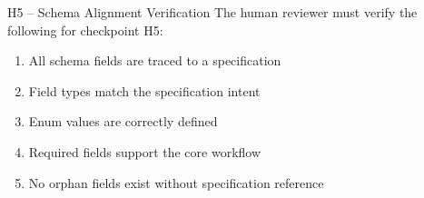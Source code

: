 \begin{hitlbox}{H5 -- Schema Alignment Verification}
The human reviewer must verify the following for checkpoint H5:
\begin{enumerate}[noitemsep]
  \item All schema fields are traced to a specification
  \item Field types match the specification intent
  \item Enum values are correctly defined
  \item Required fields support the core workflow
  \item No orphan fields exist without specification reference
\end{enumerate}
\end{hitlbox}